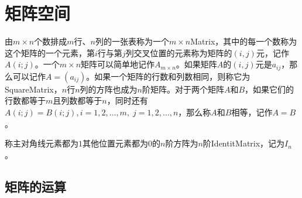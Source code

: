 \section{矩阵空间}
\begin{definition}
	由$m\times n$个数排成$m$行、$n$列的一张表称为一个$m\times n$\gls{Matrix}，其中的每一个数称为这个矩阵的一个元素，第$i$行与第$j$列交叉位置的元素称为矩阵的$(i,j)$元，记作$A(i;j)$。一个$m\times n$矩阵可以简单地记作$A_{m\times n}$。如果矩阵$A$的$(i,j)$元是$a_{ij}$，那么可以记作$A=(a_{ij})$。如果一个矩阵的行数和列数相同，则称它为\gls{SquareMatrix}，$n$行$n$列的方阵也成为$n$阶矩阵。对于两个矩阵$A$和$B$，如果它们的行数都等于$m$且列数都等于$n$，同时还有$A(i;j)=B(i;j),i=1,2,\dots,m,\;j=1,2,\dots,n$，那么称$A$和$B$相等，记作$A=B$。
\end{definition}
\begin{definition}
	称主对角线元素都为$1$其他位置元素都为$0$的$n$阶方阵为$n$阶\gls{IdentitMatrix}，记为$I_n$。
\end{definition}

\subsection{矩阵的运算}
